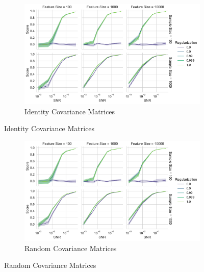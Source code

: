 \begin{figure}
\centering
\begin{subfigure}{0.49\linewidth}
\centering
\includegraphics[width=\linewidth]{figures/simulated/snr/snr_vs_scores_facet_identity}
\caption{Identity Covariance Matrices}
\end{subfigure}
\end{figure}

\begin{figure}
\centering
\begin{subfigure}{0.49\linewidth}
\centering
\includegraphics[width=\linewidth]{figures/simulated/snr/snr_vs_scores_facet_identity}
\caption{Random Covariance Matrices}
\end{subfigure}
\end{figure}


%

